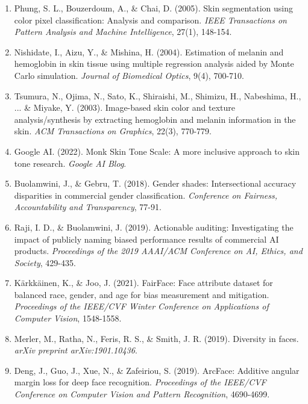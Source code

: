 \begin{enumerate}
\item Phung, S. L., Bouzerdoum, A., \& Chai, D. (2005). Skin segmentation using color pixel classification: Analysis and comparison. \textit{IEEE Transactions on Pattern Analysis and Machine Intelligence}, 27(1), 148-154.

\item Nishidate, I., Aizu, Y., \& Mishina, H. (2004). Estimation of melanin and hemoglobin in skin tissue using multiple regression analysis aided by Monte Carlo simulation. \textit{Journal of Biomedical Optics}, 9(4), 700-710.

\item Tsumura, N., Ojima, N., Sato, K., Shiraishi, M., Shimizu, H., Nabeshima, H., ... \& Miyake, Y. (2003). Image-based skin color and texture analysis/synthesis by extracting hemoglobin and melanin information in the skin. \textit{ACM Transactions on Graphics}, 22(3), 770-779.

\item Google AI. (2022). Monk Skin Tone Scale: A more inclusive approach to skin tone research. \textit{Google AI Blog}.

\item Buolamwini, J., \& Gebru, T. (2018). Gender shades: Intersectional accuracy disparities in commercial gender classification. \textit{Conference on Fairness, Accountability and Transparency}, 77-91.

\item Raji, I. D., \& Buolamwini, J. (2019). Actionable auditing: Investigating the impact of publicly naming biased performance results of commercial AI products. \textit{Proceedings of the 2019 AAAI/ACM Conference on AI, Ethics, and Society}, 429-435.

\item Kärkkäinen, K., \& Joo, J. (2021). FairFace: Face attribute dataset for balanced race, gender, and age for bias measurement and mitigation. \textit{Proceedings of the IEEE/CVF Winter Conference on Applications of Computer Vision}, 1548-1558.

\item Merler, M., Ratha, N., Feris, R. S., \& Smith, J. R. (2019). Diversity in faces. \textit{arXiv preprint arXiv:1901.10436}.

\item Deng, J., Guo, J., Xue, N., \& Zafeiriou, S. (2019). ArcFace: Additive angular margin loss for deep face recognition. \textit{Proceedings of the IEEE/CVF Conference on Computer Vision and Pattern Recognition}, 4690-4699.

\end{enumerate}

